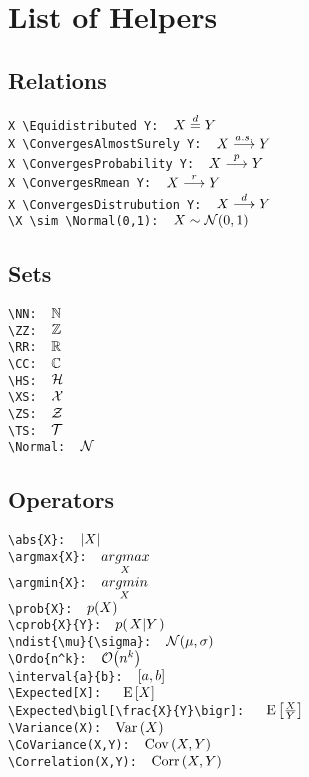 \documentclass{article}
\begin{document}
\section{List of Helpers}
\subsection{Relations}
    \verb|X \Equidistributed Y:  |$X \stackrel{d}{=} Y$ \\
    \verb|X \ConvergesAlmostSurely Y:  |$X \stackrel{a.s.}{\longrightarrow} Y$ \\
    \verb|X \ConvergesProbability Y:  |$X \stackrel{p}{\longrightarrow} Y$ \\
    \verb|X \ConvergesRmean Y:  |$X \stackrel{r}{\longrightarrow} Y$ \\
    \verb|X \ConvergesDistrubution Y:  |$X \stackrel{d}{\longrightarrow} Y$ \\
    \verb|\X \sim \Normal(0,1):  |$X \sim \mathcal{N}(0,1)$ \\
    
\subsection{Sets} 
    \verb|\NN:  |$\mathbb{N}$ \\
    \verb|\ZZ:  |$\mathbb{Z}$ \\
    \verb|\RR:  |$\mathbb{R}$ \\
    \verb|\CC:  |$\mathbb{C}$ \\
    \verb|\HS:  |$\mathcal{H}$ \\
    \verb|\XS:  |$\mathcal{X}$ \\
    \verb|\ZS:  |$\mathcal{Z}$ \\
    \verb|\TS:  |$\mathcal{T}$ \\
    \verb|\Normal:  |$\mathcal{N}$ \\

\subsection{Operators}
    \verb|\abs{X}:  |$\left\vert X \right\vert$ \\
    \verb|\argmax{X}:  |$\underset{X}{argmax}$ \\
    \verb|\argmin{X}:  |$\underset{X}{argmin}$ \\
    \verb|\prob{X}:  |$p{(X)}$ \\
    \verb|\cprob{X}{Y}:  |$p{(\left. X \middle\vert Y \right.)}$ \\
    \verb|\ndist{\mu}{\sigma}:  |$\mathcal{N}{\left(\mu, \sigma\right)}$ \\
    \verb|\Ordo{n^k}:  |$\mathcal{O}{\left(n^k\right)}$ \\
    \verb|\interval{a}{b}:  |$\left[a, b\right]$ \\
    \verb|\Expected[X]:   |${\rm E}\,[X]$ \\
    \verb|\Expected\bigl[\frac{X}{Y}\bigr]:   |${\rm E}\,\bigl[\frac{X}{Y}\bigr]$ \\
    \verb|\Variance(X):  |${\rm Var}\,(X)$ \\
    \verb|\CoVariance(X,Y):  |${\rm Cov}\,(X,Y)$ \\
    \verb|\Correlation(X,Y):  |${\rm Corr}\,(X,Y)$ \\
\end{document}
